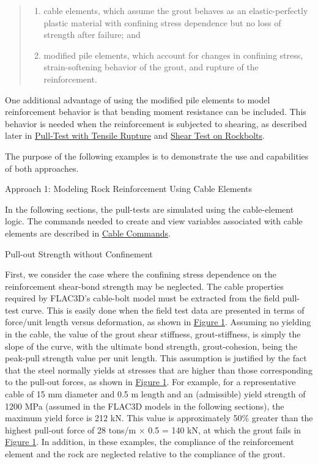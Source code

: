 \documentclass[a4paper, nobind]{templates/ociamthesis}
\begin{document}
\begin{quote}
\begin{enumerate}
\def\labelenumi{\arabic{enumi}.}
\item
  cable elements, which assume the grout behaves as an
  elastic-perfectly
  plastic material with confining stress dependence but no loss of
  strength after
  failure; and
\item
  modified pile elements, which account for changes in confining
  stress,
  strain-softening behavior of the grout, and rupture of the
  reinforcement.
\end{enumerate}
\end{quote}

One additional advantage of using the modified pile elements to model
reinforcement behavior is that bending moment resistance can be
included. This
behavior is needed when the reinforcement is subjected to shearing, as
described
later in \protect\hyperlink{pulltest-tensile-rupture-section}{Pull-Test with Tensile
Rupture} and \protect\hyperlink{pulltest-shear-bolt-section}{Shear Test on
Rockbolts}.

The purpose of the following examples is to demonstrate the use and
capabilities of both approaches.

Approach 1: Modeling Rock Reinforcement Using Cable
Elements

In the following sections, the pull-tests are simulated using the
cable-element logic. The commands needed to create and view variables
associated
with cable elements are described in \href{../../../../sel/doc/manual/sel_manual/cables/commands/cable_commands.html\#sel-cable-commands}{Cable
Commands}.

Pull-out Strength without
Confinement

First, we consider the case where the confining stress dependence on the
reinforcement shear-bond strength may be neglected. The cable properties
required by FLAC3D's cable-bolt model must be
extracted from the field pull-test curve. This is easily done when the
field
test data are presented in terms of force/unit length versus
deformation, as
shown in \protect\hyperlink{pulltest-fieldresults}{Figure 1}. Assuming no yielding in
the cable, the value of the grout shear stiffness, grout-stiffness, is
simply the slope of the curve, with the
ultimate bond strength, grout-cohesion, being the
peak-pull strength value per unit length. This assumption is justified
by the
fact that the steel normally yields at stresses that are higher than
those
corresponding to the pull-out forces, as shown in \protect\hyperlink{pulltest-fieldresults}{Figure
1}. For example, for a representative
cable of 15 mm diameter and 0.5 m length and an (admissible) yield
strength of
1200 MPa (assumed in the FLAC3D models in the
following sections), the maximum yield force is 212 kN. This value is
approximately 50\% greater than the highest pull-out force of 28 tons/m ×
0.5 =
140 kN, at which the grout fails in \protect\hyperlink{pulltest-fieldresults}{Figure
1}. In addition, in these examples, the
compliance of the reinforcement
element and the rock are neglected relative to the compliance of the
grout.
\end{document}
